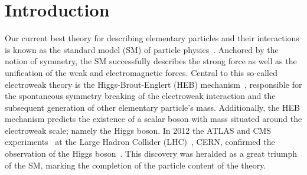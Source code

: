 \chapter{Introduction}
\label{chap:intro}



Our current best theory for describing elementary particles and their interactions is known as the standard model (SM) of particle physics~\cite{Glashow:1961tr,Weinberg:1967tq,Salam:1968rm}. Anchored by the notion of symmetry, the SM successfully describes the strong force as well as the unification of the weak and electromagnetic forces. Central to this so-called electroweak theory is the Higgs-Brout-Englert (HEB) mechanism~\cite{Englert:1964et,HIGGS1964132,Higgs:1964pj,Guralnik:1964eu,PhysRev.145.1156,PhysRev.155.1554}, responsible for the spontaneous symmetry breaking of the electroweak interaction and the subsequent generation of other elementary particle's mass. Additionally, the HEB mechanism predicts the existence of a scalar boson with mass situated around the electroweak scale; namely the Higgs boson. In 2012 the ATLAS and CMS experiments~\cite{Aad:2008zzm,Chatrchyan:2008zzk} at the Large Hadron Collider (LHC)~\cite{1748-0221-3-08-S08001}, CERN, confirmed the observation of the Higgs boson~\cite{Aad:2012tfa,Chatrchyan:2012xdj,Chatrchyan:2013lba}. This discovery was heralded as a great triumph of the SM, marking the completion of the particle content of the theory.

